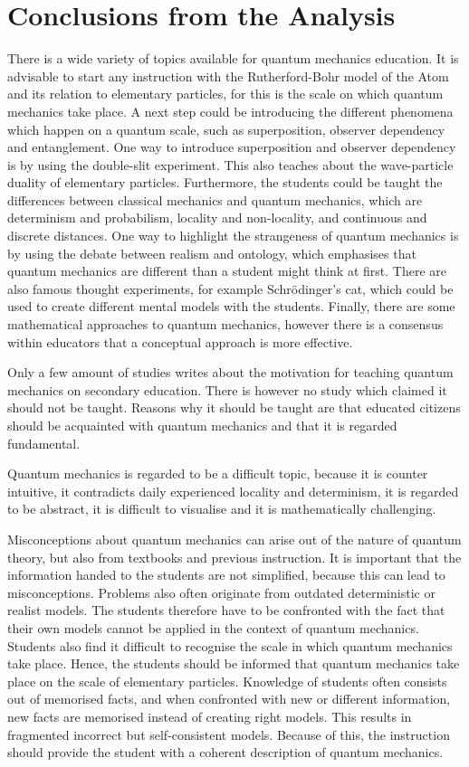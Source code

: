 \documentclass[11pt,twoside]{report} %
\begin{document}
\chapter{Conclusions from the Analysis}

There is a wide variety of topics available for quantum mechanics education. It is advisable to start any instruction with the Rutherford-Bohr model of the Atom and its relation to elementary particles, for this is the scale on which quantum mechanics take place. A next step could be introducing the different phenomena which happen on a quantum scale, such as superposition, observer dependency and entanglement. One way to introduce superposition and observer dependency is by using the double-slit experiment. This also teaches about the wave-particle duality of elementary particles. Furthermore, the students could be taught the differences between classical mechanics and quantum mechanics, which are determinism and probabilism, locality and non-locality, and continuous and discrete distances. One way to highlight the strangeness of quantum mechanics is by using the debate between realism and ontology, which emphasises that quantum mechanics are different than a student might think at first. There are also famous thought experiments, for example Schrödinger's cat, which could be used to create different mental models with the students. Finally, there are some mathematical approaches to quantum mechanics, however there is a consensus within educators that a conceptual approach is more effective.

Only a few amount of studies writes about the motivation for teaching quantum mechanics on secondary education. There is however no study which claimed it should not be taught. Reasons why it should be taught are that educated citizens should be acquainted with quantum mechanics and that it is regarded fundamental.

Quantum mechanics is regarded to be a difficult topic, because it is counter intuitive, it contradicts daily experienced locality and determinism, it is regarded to be abstract, it is difficult to visualise and it is mathematically challenging.

Misconceptions about quantum mechanics can arise out of the nature of quantum theory, but also from textbooks and previous instruction. It is important that the information handed to the students are not simplified, because this can lead to misconceptions. Problems also often originate from outdated deterministic or realist models. The students therefore have to be confronted with the fact that their own models cannot be applied in the context of quantum mechanics. Students also find it difficult to recognise the scale in which quantum mechanics take place. Hence, the students should be informed that quantum mechanics take place on the scale of elementary particles. Knowledge of students often consists out of memorised facts, and when confronted with new or different information, new facts are memorised instead of creating right models. This results in fragmented incorrect but self-consistent models. Because of this, the instruction should provide the student with a coherent description of quantum mechanics.
\end{document}

